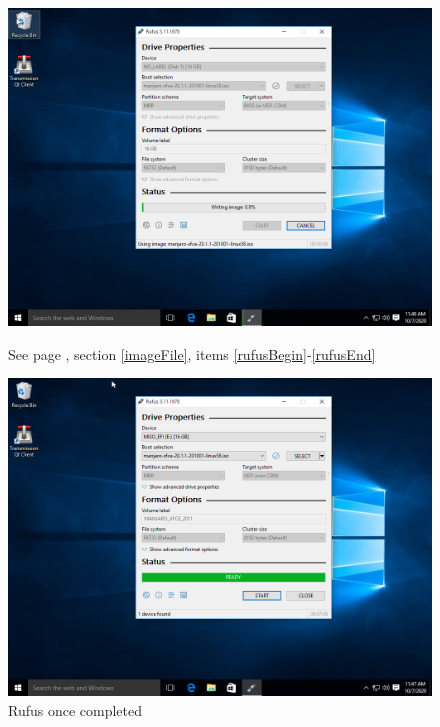 \documentclass{article}
\begin{document}
\begin{figure}[ht!]
\begin{minipage}{0.5\textwidth}
        \includegraphics[width=.95\linewidth]{images/allow_some_time_for_rufus_to_install_the_iso_file_onto_the_flash_drive.png}
        \caption{See page \pageref{imageFile}, section \ref{imageFile}, items \ref{rufusBegin}-\ref{rufusEnd}}
        \label{fig:rufusInterface}
    \end{minipage}\hfill
    \centering
    \begin{minipage}{0.5\textwidth}
        \includegraphics[width=.95\linewidth]{images/After_rufus_is_done_shutdown_youR_computer_and_say_good_buy_to_windows.png}
        \caption{Rufus once completed}
        \label{fig:rufusDone}
    \end{minipage}\hfill
\end{figure}
\end{document}
